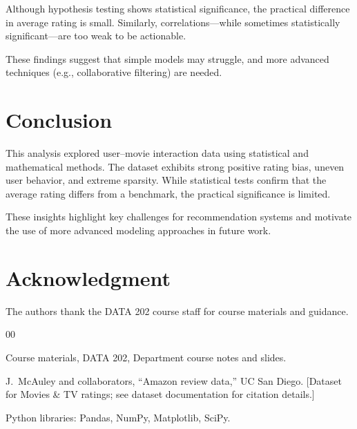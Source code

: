 \documentclass[conference]{IEEEtran}
\begin{document}
Although hypothesis testing shows statistical significance, the practical difference in average rating is small. Similarly, correlations---while sometimes statistically significant---are too weak to be actionable.

These findings suggest that simple models may struggle, and more advanced techniques (e.g., collaborative filtering) are needed.

\section{Conclusion}

This analysis explored user--movie interaction data using statistical and mathematical methods. The dataset exhibits strong positive rating bias, uneven user behavior, and extreme sparsity. While statistical tests confirm that the average rating differs from a benchmark, the practical significance is limited.

These insights highlight key challenges for recommendation systems and motivate the use of more advanced modeling approaches in future work.

\section*{Acknowledgment}

The authors thank the DATA 202 course staff for course materials and guidance.

\begin{thebibliography}{00}

 Course materials, DATA 202, Department course notes and slides.

 J.~McAuley and collaborators, ``Amazon review data,'' UC San Diego. [Dataset for Movies \& TV ratings; see dataset documentation for citation details.]

 Python libraries: Pandas, NumPy, Matplotlib, SciPy.

\end{thebibliography}
\end{document}
